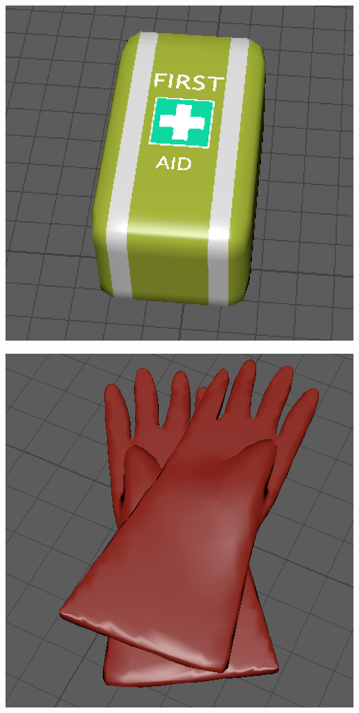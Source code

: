 \documentclass[a4paper, openright, twoside]{book}
\begin{document}
\begin{minipage}{\textwidth}
\begin{center}
\begin{minipage}{0.25\textwidth}
        \includegraphics[width=1\textwidth]{images/firstaid.png}
    \end{minipage}\hfill
\end{center}
\begin{center}
    \centering
    \begin{minipage}{0.25\textwidth}
        \centering
        \includegraphics[width=1\textwidth]{images/gloves.png}

\end{minipage}
\end{center}
\end{minipage}
\end{document}
